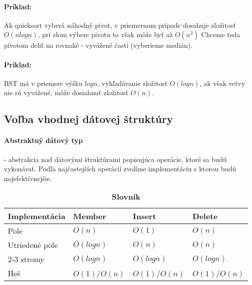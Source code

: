 		\paragraph{Príklad:} Ak quicksort vyberá náhodný pivot, v priemernom prípade dosahuje zložitosť $O(n log n)$, pri zlom výbere pivotu to však môže byť až $O(n^{2})$ Chceme teda pivotom deliť na rovnaké - vyvážené časti (vyberieme medián).\\
		\paragraph{Príklad:} BST má v priemere výšku $log n$, vyhľadávanie zložitosť $O(log n)$, ak však vetvy nie sú vyvážené, môže dosiahnuť zložitosť $O(n)$.
	

	\subsection{Voľba vhodnej dátovej štruktúry}
		\paragraph{Abstraktný dátový typ} - abstrakcia nad dátovými štruktúrami popisujúca operácie, ktoré sa budú vykonávať. Podľa najčastejších operácií zvolíme implementáciu s ktorou budú najefektívnejšie.\\

		\begin{table}[h]
			\centering
			\caption{\textbf{Slovník}}
			\label{my-label}
			\begin{tabular}{|l|l|l|l|}
			\hline
			\textbf{Implementácia} & \textbf{Member} & \textbf{Insert} & \textbf{Delete}  \\ \hline
			Pole                   & $O(n)$            & $O(1)$           & $O(n)$             \\ \hline
			Utriedené pole         & $O(log n)$        & $O(n)$            & $O(n)$             \\ \hline
			2-3 stromy             & $O(log n)$        & $O(log n)$        & $O(log n)$          \\ \hline
			Heš                    & $O(1)$/$O(n)$      & $O(1)$/$O(n)$       & $O(1)$/$O(n)$        \\ \hline
			\end{tabular}
		\end{table}

